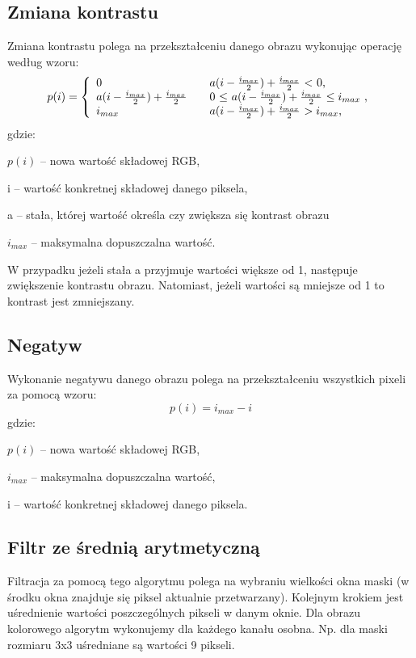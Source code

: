 \documentclass{classrep}
\begin{document}
\subsection{Zmiana kontrastu}
Zmiana kontrastu polega na przekształceniu danego obrazu wykonując operację według wzoru:
\begin{equation}
\label{kontrastWzor}
p(i)=\left\{
\begin{array}{l l l}
0 & \quad \mbox{$a (i-\frac{i_{max}}{2}) + \frac{i_{max}}{2}$ $<$ 0,} \\
a (i-\frac{i_{max}}{2}) + \frac{i_{max}}{2} & \quad \mbox{0 $\leq$ $a (i-\frac{i_{max}}{2}) + \frac{i_{max}}{2}$ $\leq i_{max}$ ,} \\
i_{max} & \quad \mbox{$a (i-\frac{i_{max}}{2}) + \frac{i_{max}}{2}$ $ > i_{max}$,} \\
\end{array}
\right.
\end{equation}
gdzie:
\begin{description}
\item $p(i)$ -- nowa wartość składowej RGB,
\item i -- wartość konkretnej składowej danego piksela,
\item a -- stała, której wartość określa czy zwiększa się kontrast obrazu
\item $i_{max}$ -- maksymalna dopuszczalna wartość.
\end{description}

W przypadku jeżeli stała a przyjmuje wartości większe od 1, następuje zwiększenie kontrastu obrazu. Natomiast, jeżeli wartości są mniejsze od 1 to kontrast jest zmniejszany. 

\subsection{Negatyw}
Wykonanie negatywu danego obrazu polega na przekształceniu wszystkich pixeli za pomocą wzoru:
\begin{equation}
 p(i) = i_{max} - i
\end{equation}
gdzie:
\begin{description}
\item $p(i)$ -- nowa wartość składowej RGB,
\item $i_{max}$ -- maksymalna dopuszczalna wartość,
\item i -- wartość konkretnej składowej danego piksela.
\end{description}

\subsection{Filtr ze średnią arytmetyczną}
Filtracja za pomocą tego algorytmu polega na wybraniu wielkości okna maski (w środku okna znajduje się piksel aktualnie przetwarzany). Kolejnym krokiem jest uśrednienie wartości poszczególnych pikseli w danym oknie. Dla obrazu kolorowego algorytm wykonujemy dla każdego kanału osobna. Np. dla maski rozmiaru 3x3 uśredniane są wartości 9 pikseli.
\end{document}
